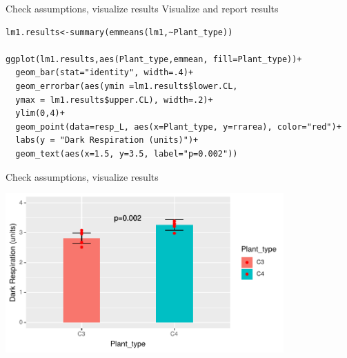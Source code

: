 \documentclass[10pt]{beamer}
\makeatletter
\newenvironment{kframe}{%
 \def\at@end@of@kframe{}%
 \ifinner\ifhmode%
  \def\at@end@of@kframe{\end{minipage}}%
  \begin{minipage}{\columnwidth}%
 \fi\fi%
 \def\FrameCommand##1{\hskip\@totalleftmargin \hskip-\fboxsep
 \colorbox{shadecolor}{##1}\hskip-\fboxsep
     \hskip-\linewidth \hskip-\@totalleftmargin \hskip\columnwidth}%
 \MakeFramed {\advance\hsize-\width
   \@totalleftmargin\z@ \linewidth\hsize
   \@setminipage}}%
 {\par\unskip\endMakeFramed%
 \at@end@of@kframe}
\newenvironment{knitrout}{}{} %
\makeatother
\begin{document}
\begin{frame}[fragile]{Check assumptions, visualize results}
Visualize and report results
\begin{knitrout}
\color{fgcolor}\begin{kframe}
\footnotesize
\begin{verbatim}
lm1.results<-summary(emmeans(lm1,~Plant_type))

ggplot(lm1.results,aes(Plant_type,emmean, fill=Plant_type))+
  geom_bar(stat="identity", width=.4)+
  geom_errorbar(aes(ymin =lm1.results$lower.CL, 
  ymax = lm1.results$upper.CL), width=.2)+
  ylim(0,4)+
  geom_point(data=resp_L, aes(x=Plant_type, y=rrarea), color="red")+
  labs(y = "Dark Respiration (units)")+
  geom_text(aes(x=1.5, y=3.5, label="p=0.002"))  
\end{verbatim}
\end{kframe}
\end{knitrout}
\end{frame}


\begin{frame}{Check assumptions, visualize results}

\includegraphics[width=0.8\textwidth]{Figures/C3C4output}
\end{frame}
\end{document}
